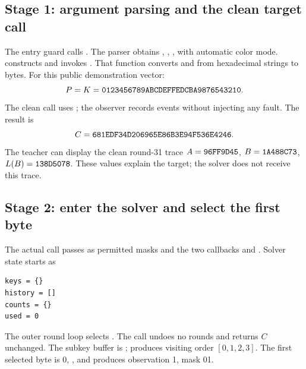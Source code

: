\subsection{Stage 1: argument parsing and the clean target call}
The entry guard calls . The parser obtains
, , , with automatic color mode.
 constructs  and invokes .
That function converts  and  from hexadecimal
strings to bytes. For this public demonstration vector:
\[
P=K=\texttt{0123456789ABCDEFFEDCBA9876543210}.
\]
The clean call uses ; the observer records events without
injecting any fault. The result is
\[
C=\texttt{681EDF34D206965E86B3E94F536E4246}.
\]
The teacher can display the clean round-31 trace
$A=\texttt{96FF9D45}$, $B=\texttt{1A488C73}$, $L(B)=\texttt{138D5078}$.
These values explain the target; the solver does not receive this trace.

\subsection{Stage 2: enter the solver and select the first byte}
The actual call passes  as permitted masks and the two
callbacks  and . Solver state starts as
\begin{Verbatim}
keys = {}
history = []
counts = {}
used = 0
\end{Verbatim}
The outer round loop selects . The call
 undoes no rounds and returns $C$ unchanged.
The subkey buffer is ;  produces visiting
order $[0,1,2,3]$. The first selected byte is 0, , and
 produces observation 1, mask 01.

